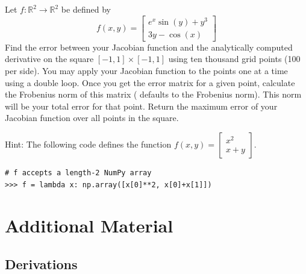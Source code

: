 \begin{problem}
\item Let $f: \mathbb{R}^2 \to \mathbb{R}^2$ be defined by
%
\begin{equation*}
f(x, y) =
\left[\begin{array}{c}
e^{x} \sin(y) + y^3 \\
3y - \cos(x)
\end{array}\right]
\end{equation*}
%
Find the error between your Jacobian function and the analytically computed derivative on the square $[-1,1] \times [-1,1]$ using ten thousand grid points (100 per side).
You may apply your Jacobian function to the points one at a time using a double  loop.  Once you get the error matrix for a given point, calculate the Frobenius norm of this matrix ( defaults to the Frobenius norm).  This norm will be your total error for that point.
Return the maximum error of your Jacobian function over all points in the square.

Hint: The following code defines the function
$f(x,y) = \left[\begin{array}{c} x^2 \\ x+y \end{array}\right]$.

\begin{lstlisting}
# f accepts a length-2 NumPy array
>>> f = lambda x: np.array([x[0]**2, x[0]+x[1]])
\end{lstlisting}
\end{problem}

\section*{Additional Material} %

\subsection*{Derivations} %

